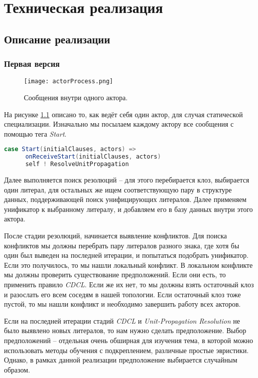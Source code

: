 \chapter{Техническая реализация}
\label{sec:chap3}

\section{Описание реализации}

\subsection{Первая версия}

\begin{figure}[!h]
\centering
\texttt{[image: actorProcess.png]}
\caption{Сообщения внутри одного актора.}\label{fig:actorProcess}
\end{figure}

На рисунке \ref{fig:actorProcess} описано то, как ведёт себя один актор, для случая статической специализации.
Изначально мы посылаем каждому актору все сообщения с помощью тега \emph{Start}.
\begin{lstlisting}[language=scala]
    case Start(initialClauses, actors) =>
      onReceiveStart(initialClauses, actors)
      self ! ResolveUnitPropagation
\end{lstlisting}

Далее выполняется поиск резолюций -- для этого перебирается клоз, выбирается один литерал, для остальных же ищем соответствующую пару в структуре данных, поддерживающей поиск унифицирующих литералов. Далее применяем унификатор к выбранному литералу, и добавляем его в базу данных внутри этого актора.

После стадии резолюций, начинается выявление конфликтов. Для поиска конфликтов мы должны перебрать пару литералов разного знака, где хотя бы один был выведен на последней итерации, и попытаться подобрать унификатор. Если это получилось, то мы нашли локальный конфликт. В локальном конфликте мы должны проверить существование предположений. Если они есть, то применить правило \emph{CDCL}. Если же их нет, то мы должны взять остаточный клоз и разослать его всем соседям в нашей топологии. Если остаточный клоз тоже пустой, то мы нашли конфликт и необходимо завершить работу всех акторов.

Если на последней итерации стадий \emph{CDCL} и \emph{Unit-Propagation Resolution} не было выявлено новых литералов, то нам нужно сделать предположение. Выбор предположений -- отдельная очень обширная для изучения тема, в которой можно использовать методы обучения с подкреплением, различные простые эвристики. Однако, в рамках данной реализации предположение выбирается случайным образом.

